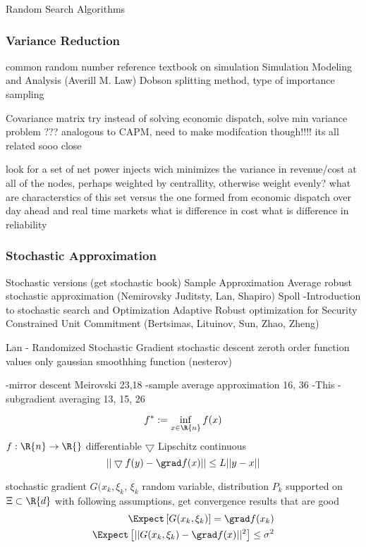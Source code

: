 Random Search Algorithms



\subsubsection{Variance Reduction}
common random number
reference textbook on simulation Simulation Modeling and Analysis (Averill M. Law) \cite{law_2007}
Dobson splitting method, type of importance sampling

Covariance matrix
try instead of solving economic dispatch, solve min variance problem ??? analogous to CAPM, need to make modifcation though!!!! its all related sooo close


look for a set of net power injects wich minimizes the variance in revenue/cost at all of the nodes, perhaps weighted by centrallity, otherwise weight evenly?
what are characterstics of this set versus the one formed from economic dispatch over day ahead and real time markets
what is difference in cost
what is difference in reliability



\subsubsection{Stochastic Approximation}

Stochastic versions (get stochastic book)
Sample Approximation Average
robust stochastic approximation (Nemirovsky Juditsty, Lan, Shapiro)
Spoll  -Introduction to stochastic search and Optimization
Adaptive Robust optimization for Security Constrained Unit Commitment  (Bertsimas, Lituinov, Sun, Zhao, Zheng)


Lan -  Randomized Stochastic Gradient
stochastic descent
zeroth order function values only
gaussian smoothhing function  (nesterov)

-mirror descent Meirovski 23,18
-sample average approximation 16, 36
-This
-subgradient averaging 13, 15, 26

\begin{equation}
f^* := \inf_{x \in \R{n}} f(x)
\end{equation}
$f: \R{n} \rightarrow \R{}$ differentiable
$\bigtriangledown$ Lipschitz continuous
\begin{equation}
|| \bigtriangledown f(y) - \grad f (x) || \le L || y - x ||
\end{equation}

stochastic gradient
$G (x_k, \xi_k$, $\xi_k$ random variable, distribution $P_k$ supported on $\Xi \subset \R{d}$
with following assumptions, get convergence results that are good
\begin{align}
\Expect \left[ G(x_k,\xi_k) \right] = \grad f (x_k)		\\
\Expect \left[ || G(x_k,\xi_k) - \grad f(x)||^2 \right] \le \sigma^2
\end{align}

